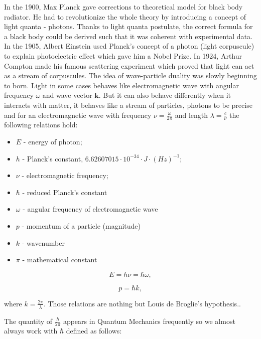 \documentclass[a4paper,oneside,openright,11pt]{book}
\begin{document}
In the 1900, Max Planck gave corrections to theoretical model for black body radiator. He had to revolutionize the whole theory by introducing a concept of light quanta - photons. Thanks to light quanta postulate, the correct formula for a black body could be derived such that it was coherent with experimental data. In the 1905, Albert Einstein used Planck's concept of a photon (light corpuscule) to explain photoelectric effect which gave him a Nobel Prize. In 1924, Arthur Compton made his famous scattering experiment which proved that light can act as a stream of corpuscules. The idea of wave-particle duality was slowly beginning to born. Light in some cases behaves like electromagnetic wave with angular frequency $\omega$ and wave vector $\textbf{k}$. But it can also behave differently when it interacts with matter, it behaves like a stream of particles, photons to be precise and for an electromagnetic wave with frequency $\nu = \frac{\omega}{2 \pi}$ and length $\lambda = \frac{c}{\nu}$ the following relations hold:

\begin{itemize}
    \item $E$ - energy of photon;
    \item $h$ - Planck's constant, $6.62607015 \cdot 10^{-34} \cdot J \cdot (Hz)^{-1}$;
    \item $\nu$ - electromagnetic frequency;
    \item $\hbar$ - reduced Planck's constant
    \item $\omega$ - angular frequency of electromagnetic wave
    \item $p$ - momentum of a particle (magnitude)
    \item $k$ - wavenumber
    \item $\pi$ - mathematical constant
\end{itemize}

\begin{equation}
    E = h \nu = \hbar \omega,
\end{equation}

\begin{equation}
    p = \hbar k,
\end{equation}

where $k = \frac{2 \pi}{\lambda}$. Those relations are nothing but Louis de Broglie's hypothesis.\cite{kryszewski}.

The quantity of $\frac{h}{2 \pi}$ appears in Quantum Mechanics frequently so we almost always work with $\hbar$ defined as follows:
\end{document}
